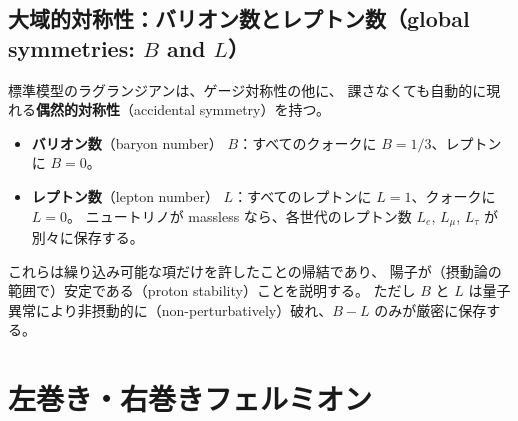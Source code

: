 \documentclass[uplatex,dvipdfmx,a4paper,11pt,openany]{jsbook}
\newcommand{\term}[2]{\textbf{#1}（#2）}
\newcommand{\en}[1]{（#1）}
\numberwithin{equation}{chapter}
\theoremstyle{definition}
\theoremstyle{plain}
\theoremstyle{remark}
\begin{document}
\subsection{大域的対称性：バリオン数とレプトン数（global symmetries: $B$ and $L$）}
標準模型のラグランジアンは、ゲージ対称性の他に、
課さなくても自動的に現れる\term{偶然的対称性}{accidental symmetry}を持つ。
\begin{itemize}
    \item \term{バリオン数}{baryon number} $B$：すべてのクォークに $B=1/3$、レプトンに $B=0$。
    \item \term{レプトン数}{lepton number} $L$：すべてのレプトンに $L=1$、クォークに $L=0$。
    ニュートリノが massless なら、各世代のレプトン数 $L_e$, $L_\mu$, $L_\tau$ が別々に保存する。
\end{itemize}
これらは繰り込み可能な項だけを許したことの帰結であり、
陽子が（摂動論の範囲で）安定である\en{proton stability}ことを説明する。
ただし $B$ と $L$ は量子異常により非摂動的に\en{non-perturbatively}破れ、$B-L$ のみが厳密に保存する。
\section{左巻き・右巻きフェルミオン}
\label{sec:chirality}
\end{document}
